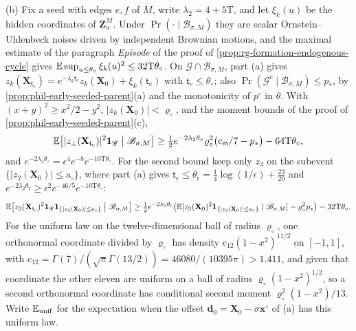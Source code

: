 (b) Fix a seed with edges \(e,f\) of \(M\), write
\(\lambda_2=4+5\mathrm T\), and let \(\xi_k(u)\) be the hidden coordinates of
\(\mathbf Z^M_u\). Under \(\Pr(\cdot\mid\mathscr B_{\sigma,M})\) they are
scalar Ornstein--Uhlenbeck noises driven by independent Brownian motions, and
the maximal estimate of the paragraph \emph{Episode} of the proof of
\cref{prop:rg-formation-endogenous-cycle} gives
\(\mathbb E\sup_{u\le\theta_\circ}\xi_k(u)^2\le32\mathrm T\theta_\circ\). On
\(\mathscr G\cap\mathscr B_{\sigma,M}\), part (a) gives
\(z_k(\mathbf X_{\mathsf t_{\mathrm c}})=e^{-\lambda_k\mathsf t_{\mathrm c}}
z_k(\mathbf X_0)+\xi_k(\mathsf t_{\mathrm c})\) with
\(\mathsf t_{\mathrm c}\le\theta_\circ\); also
\(\Pr(\mathscr G^c\mid\mathscr B_{\sigma,M})\le p_*\), by
\cref{prop:phil-early-seeded-parent}(a) and the monotonicity of \(p^\circ\) in
\(\theta\). With \((x+y)^2\ge x^2/2-y^2\),
\(|z_k(\mathbf X_0)|<\varrho_\circ\), and the moment bounds of the proof of
\cref{prop:phil-early-seeded-parent}(c),
\[
 \mathbb E\bigl[|z_\perp(\mathbf X_{\mathsf t_{\mathrm c}})|^2\mathbf 1_{\mathscr G}
   \bigm|\mathscr B_{\sigma,M}\bigr]
 \ge\tfrac12e^{-2\lambda_2\theta_\circ}\varrho_\circ^2
   \bigl(\mathrm c_{\mathsf m}/7-p_*\bigr)-64\mathrm T\theta_\circ,
\]
and \(e^{-2\lambda_2\theta_\circ}=\epsilon^4e^{-8}e^{-10\mathrm T\theta_\circ}\).
For the second bound keep only \(z_3\) on the subevent
\(\{|z_2(\mathbf X_0)|\le\mathrm a_\circ\}\), where part (a) gives
\(\mathsf t_{\mathrm c}\le\theta_{\mathrm r}=\frac14\log(1/\epsilon)+\frac{23}{20}\)
and \(e^{-2\lambda_2\theta_{\mathrm r}}\ge
\epsilon^2e^{-46/5}e^{-10\mathrm T\theta_\circ}\):
\[
 \mathbb E\bigl[z_3(\mathbf X_{\mathsf t_{\mathrm c}})^2\mathbf 1_{\mathscr G}
   \mathbf 1_{\{|z_2(\mathbf X_0)|\le\mathrm a_\circ\}}\bigm|\mathscr B_{\sigma,M}\bigr]
 \ge\tfrac12e^{-2\lambda_2\theta_{\mathrm r}}
   \bigl(\mathbb E[z_3(\mathbf X_0)^2\mathbf 1_{\{|z_2(\mathbf X_0)|\le\mathrm a_\circ\}}
     \mid\mathscr B_{\sigma,M}]-\varrho_\circ^2p_*\bigr)
   -32\mathrm T\theta_\circ .
\]
For the uniform law on the twelve-dimensional ball of radius
\(\varrho_\circ\), one orthonormal coordinate divided by \(\varrho_\circ\) has
density \(\mathrm c_{12}(1-x^2)^{11/2}\) on \([-1,1]\), with
\(\mathrm c_{12}=\Gamma(7)/(\sqrt\pi\Gamma(13/2))=46080/(10395\pi)>1.411\),
and given that coordinate the other eleven are uniform on a ball of radius
\(\varrho_\circ(1-x^2)^{1/2}\), so a second orthonormal coordinate has
conditional second moment \(\varrho_\circ^2(1-x^2)/13\). Write
\(\mathbb E_{\mathrm{unif}}\) for the expectation when the offset
\(\mathbf d_0=\mathbf X_0-\sigma\mathbf x^\circ\) of (a) has this uniform law.
